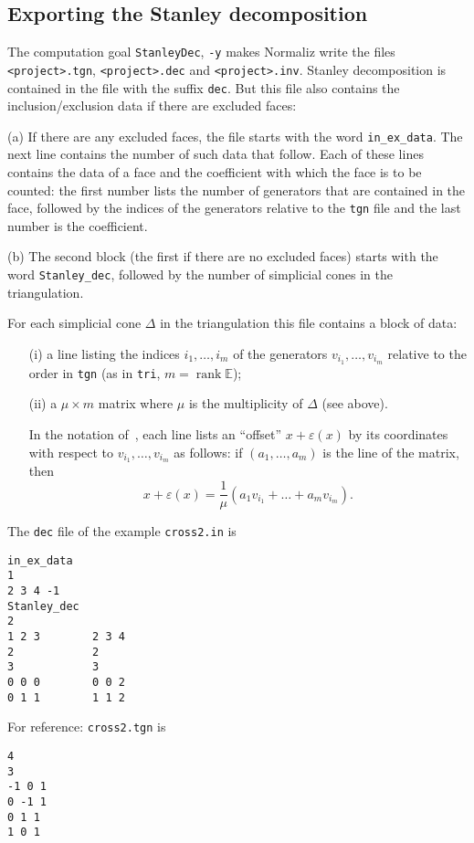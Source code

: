 \documentclass[12pt,a4paper]{scrartcl}
\newcounter{listi}
\theoremstyle{definition}
\def\EE{{\mathbb E}}
\DeclareMathOperator{\rank}{rank}
\let\epsilon=\varepsilon
\def\ttt{\texttt}
\begin{document}
\subsection{Exporting the Stanley decomposition}\label{Stanley}

The computation goal \ttt{StanleyDec}, \ttt{-y} makes Normaliz
write the files \ttt{<project>.tgn}, \verb|<project>.dec| and \verb|<project>.inv|. Stanley decomposition is contained in the file with the suffix \verb|dec|. But this file also contains the inclusion/exclusion data if there are excluded faces:

(a) If there are any excluded faces, the file starts with the word
\verb|in_ex_data|. The next line contains the number of such data that follow.
Each of these lines contains the data of a face and the coefficient with which
the face is to be counted: the first number lists the number of generators that
are contained in the face, followed by the indices of the generators relative
to the \verb|tgn| file and the last number is the coefficient.

(b) The second block (the first if there are no excluded faces) starts with
the word \verb|Stanley_dec|, followed by the number of simplicial cones in the
triangulation.

For each simplicial cone $\Delta$ in the
triangulation this file contains a block of data:
\begin{enumerate}
	\item[(i)] a line listing the indices $i_1,\dots,i_m$ of the
	generators $v_{i_1},\dots,v_{i_m}$ relative to the
	order in \ttt{tgn} (as in \ttt{tri}, $m=\rank \EE$);
	
	\item[(ii)] a $\mu\times m$ matrix where $\mu$ is the
	multiplicity of $\Delta$ (see above).
	
	In the notation of~\cite{BIS}, each line lists an
	``offset'' $x+\epsilon(x)$ by its coordinates with
	respect to $v_{i_1},\dots,v_{i_m}$ as follows: if
	$(a_1,\dots,a_m)$ is the line of the matrix, then
	$$
	x+\epsilon(x)=\frac{1}{\mu}(a_1v_{i_1}+\dots+a_mv_{i_m}).
	$$
\end{enumerate}


The \verb|dec| file of the example \verb|cross2.in| is
\begin{Verbatim}
in_ex_data
1
2 3 4 -1
Stanley_dec
2
1 2 3        2 3 4 
2            2
3            3
0 0 0        0 0 2 
0 1 1        1 1 2 
\end{Verbatim}
For reference: \verb|cross2.tgn| is
\begin{Verbatim}
4
3
-1 0 1 
0 -1 1 
0 1 1 
1 0 1 
\end{Verbatim}
\end{document}
